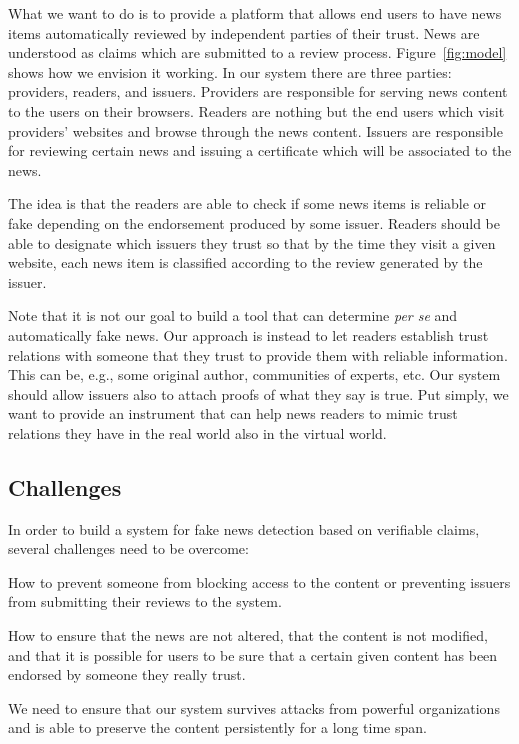 \documentclass[letterpaper,twocolumn,10pt]{article}
\newcommand{\mypara}[1]{\vspace{5pt}\noindent{\bf {#1}}}
\begin{document}
What we want to do is to provide a platform that allows end users to have news items automatically reviewed by independent parties of their trust. News are understood as claims which are submitted to a review process. Figure~\ref{fig:model} shows how we envision it working. In our system there are three parties: providers, readers, and issuers. Providers are responsible for serving news content to the users on their browsers. Readers are nothing but the end users which visit providers' websites and browse through the news content. Issuers are responsible for reviewing certain news and issuing a certificate which will be associated to the news.

The idea is that the readers are able to check if some news items is reliable or fake depending on the endorsement produced by some issuer. Readers should be able to designate which issuers they trust so that by the time they visit a given website, each news item is classified according to the review generated by the issuer.

Note that it is not our goal to build a tool that can determine {\em per se} and automatically fake news. Our approach is instead to let readers establish trust relations with someone that they trust to provide them with reliable information. This can be, e.g., some original author, communities of experts, etc. Our system should allow issuers also to attach proofs of what they say is true. Put simply, we want to provide an instrument that can help news readers to mimic trust relations they have in the real world also in the virtual world.


\subsection{Challenges}

In order to build a system for fake news detection based on verifiable claims, several challenges need to be overcome:

\mypara{Censorship resistance:} How to prevent someone from blocking access to the content or preventing issuers from submitting their reviews to the system.

\mypara{Security:} How to ensure that the news are not altered, that the content is not modified, and that it is possible for users to be sure that a certain given content has been endorsed by someone they really trust.

\mypara{Resilience:} We need to ensure that our system survives attacks from powerful organizations and is able to preserve the content persistently for a long time span.
\end{document}
